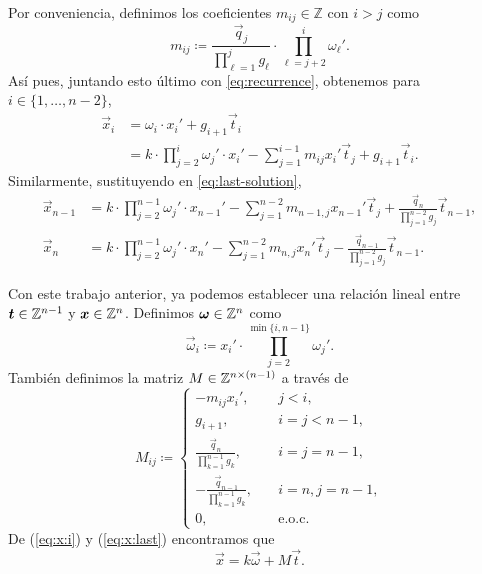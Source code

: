 Por conveniencia, definimos los coeficientes $m_{ij} \in \mathbb{Z}$ con $i > j$ como
\begin{equation}
	\label{phase-2:eq:coeffs}
	m_{ij} \coloneq \frac{\vec{q}_j}{\prod_{\ell = 1}^{j}g_\ell} \cdot \prod_{\ell = j +
	2}^{i}\omega_\ell'.
\end{equation}
Así pues, juntando esto último con \ref{eq:recurrence}, obtenemos para $i \in \{1, \ldots, n -
2\}$, 
\begin{align}
	\vec{x}_i &= \omega_i \cdot x_i' + g_{i + 1}\vec{t}_i \nonumber \\
		&= k \cdot \prod_{j=2}^{i}\omega_j' \cdot x_i' - \sum_{j=1}^{i - 1}m_{ij}x_i'
		\vec{t}_j + g_{i + 1}\vec{t}_i \label{eq:x:i}.
\end{align}
Similarmente, sustituyendo en \ref{eq:last-solution},
\begin{subequations}
	\label{eq:x:last}
	\begin{align}
		\vec{x}_{n-1} &= k \cdot \prod_{j=2}^{n-1} \omega_j' \cdot x_{n-1}' - \sum_{j=1}^{n-2}
		m_{n-1,j}x_{n-1}' \vec{t}_j + \frac{\vec{q}_n}{\prod_{j=1}^{n-2}g_j} \vec{t}_{n-1}, \\
		\vec{x}_{n} &= k \cdot \prod_{j=2}^{n-1} \omega_j' \cdot x_{n}' - \sum_{j=1}^{n-2}
		m_{n,j}x_{n}' \vec{t}_j - \frac{\vec{q}_{n - 1}}{\prod_{j=1}^{n-2}g_j} \vec{t}_{n-1}.
	\end{align}
\end{subequations}

Con este trabajo anterior, ya podemos establecer una relación lineal entre $\boldsymbol{t} \in \mathbb{Z}^{n-1}$ y
$\boldsymbol{x} \in \mathbb{Z}^n$. Definimos $\boldsymbol{\omega} \in \mathbb{Z}^n$ como
\begin{equation}
	\label{eq:vec-omega}
	\vec{\omega}_i \coloneq x_i' \cdot \prod_{j = 2}^{\min{\lbrace i, n - 1 \rbrace}}\omega_j'.
\end{equation}
También definimos la matriz $M \in \mathbb{Z}^{n \times (n - 1)}$ a través de
\begin{equation}
	\label{eq:mat-T}
	M_{ij} \coloneq \begin{cases}
		-m_{ij}x_i', &\quad j < i, \\
		g_{i + 1},  &\quad i = j < n - 1, \\
		\frac{\vec{q}_n}{\prod_{k=1}^{n-1}g_k}, &\quad i = j = n - 1, \\
		-\frac{\vec{q}_{n-1}}{\prod_{k=1}^{n-1}g_k}, &\quad i = n, j = n - 1, \\
		0, &\quad \text{e.o.c.}
	\end{cases}
\end{equation}
De (\ref{eq:x:i}) y (\ref{eq:x:last}) encontramos que
\begin{equation}
	\label{eq:transf}
	\vec{x} = k\vec{\omega} + M\vec{t}.
\end{equation}

